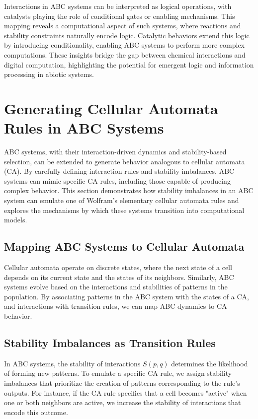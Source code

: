 \documentclass[entropy,article,submit,pdftex,moreauthors]{Definitions/mdpi}
\begin{document}
Interactions in ABC systems can be interpreted as logical operations, with catalysts playing the role of conditional gates or enabling mechanisms. This mapping reveals a computational aspect of such systems, where reactions and stability constraints naturally encode logic. Catalytic behaviors extend this logic by introducing conditionality, enabling ABC systems to perform more complex computations. These insights bridge the gap between chemical interactions and digital computation, highlighting the potential for emergent logic and information processing in abiotic systems.

\section{Generating Cellular Automata Rules in ABC Systems}

ABC systems, with their interaction-driven dynamics and stability-based selection, can be extended to generate behavior analogous to cellular automata (CA). By carefully defining interaction rules and stability imbalances, ABC systems can mimic specific CA rules, including those capable of producing complex behavior. This section demonstrates how stability imbalances in an ABC system can emulate one of Wolfram’s elementary cellular automata rules and explores the mechanisms by which these systems transition into computational models.

\subsection{Mapping ABC Systems to Cellular Automata}

Cellular automata operate on discrete states, where the next state of a cell depends on its current state and the states of its neighbors. Similarly, ABC systems evolve based on the interactions and stabilities of patterns in the population. By associating patterns in the ABC system with the states of a CA, and interactions with transition rules, we can map ABC dynamics to CA behavior.

\subsection{Stability Imbalances as Transition Rules}

In ABC systems, the stability of interactions \( S(p, q) \) determines the likelihood of forming new patterns. To emulate a specific CA rule, we assign stability imbalances that prioritize the creation of patterns corresponding to the rule’s outputs. For instance, if the CA rule specifies that a cell becomes "active" when one or both neighbors are active, we increase the stability of interactions that encode this outcome.
\end{document}
